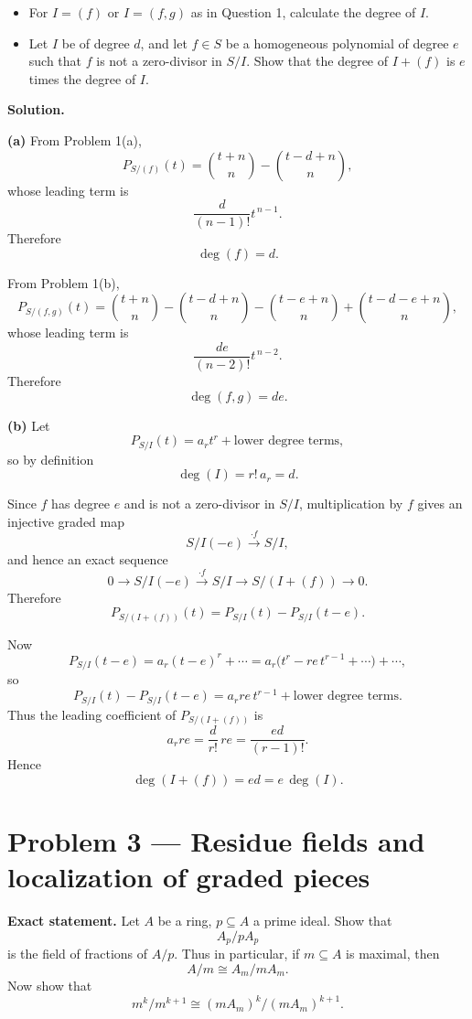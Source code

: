 \documentclass[12pt,a4paper]{article}
\theoremstyle{plain}
\theoremstyle{definition}      %
\begin{document}
	\begin{itemize}
		\item[(a)] For \(I=(f)\) or \(I=(f,g)\) as in Question 1, calculate the degree of \(I\).
		\item[(b)] Let \(I\) be of degree \(d\), and let \(f\in S\) be a homogeneous polynomial of degree \(e\) such that \(f\) is not a zero-divisor in \(S/I\). Show that the degree of \(I+(f)\) is \(e\) times the degree of \(I\).
	\end{itemize}
	
	\textbf{Solution.}
	
	\textbf{(a)} From Problem 1(a),
	\[
	P_{S/(f)}(t)=\binom{t+n}{n}-\binom{t-d+n}{n},
	\]
	whose leading term is
	\[
	\frac{d}{(n-1)!}t^{\,n-1}.
	\]
	Therefore
	\[
	\deg(f)=d.
	\]
	
	From Problem 1(b),
	\[
	P_{S/(f,g)}(t)
	=
	\binom{t+n}{n}
	-\binom{t-d+n}{n}
	-\binom{t-e+n}{n}
	+\binom{t-d-e+n}{n},
	\]
	whose leading term is
	\[
	\frac{de}{(n-2)!}t^{\,n-2}.
	\]
	Therefore
	\[
	\deg(f,g)=de.
	\]
	
	\medskip
	
	\textbf{(b)} Let
	\[
	P_{S/I}(t)=a_r t^r+\text{lower degree terms},
	\]
	so by definition
	\[
	\deg(I)=r!\,a_r=d.
	\]
	
	Since \(f\) has degree \(e\) and is not a zero-divisor in \(S/I\), multiplication by \(f\) gives an injective graded map
	\[
	S/I(-e)\xrightarrow{\cdot f} S/I,
	\]
	and hence an exact sequence
	\[
	0\longrightarrow S/I(-e)\xrightarrow{\cdot f} S/I\longrightarrow S/(I+(f))\longrightarrow 0.
	\]
	Therefore
	\[
	P_{S/(I+(f))}(t)=P_{S/I}(t)-P_{S/I}(t-e).
	\]
	
	Now
	\[
	P_{S/I}(t-e)=a_r(t-e)^r+\cdots
	=a_r\bigl(t^r-r e\, t^{r-1}+\cdots\bigr)+\cdots,
	\]
	so
	\[
	P_{S/I}(t)-P_{S/I}(t-e)
	=
	a_r r e\, t^{r-1}+\text{lower degree terms}.
	\]
	Thus the leading coefficient of \(P_{S/(I+(f))}\) is
	\[
	a_r r e=\frac{d}{r!}\,r e=\frac{ed}{(r-1)!}.
	\]
	Hence
	\[
	\deg(I+(f))=ed=e\,\deg(I).
	\]
	
	\bigskip
	
	\section*{Problem 3 --- Residue fields and localization of graded pieces}
	
	\textbf{Exact statement.}
	Let \(A\) be a ring, \(p\subseteq A\) a prime ideal. Show that
	\[
	A_p/pA_p
	\]
	is the field of fractions of \(A/p\). Thus in particular, if \(m\subseteq A\) is maximal, then
	\[
	A/m \cong A_m/mA_m.
	\]
	Now show that
	\[
	m^k/m^{k+1}\cong (mA_m)^k/(mA_m)^{k+1}.
	\]
	
\end{document}
